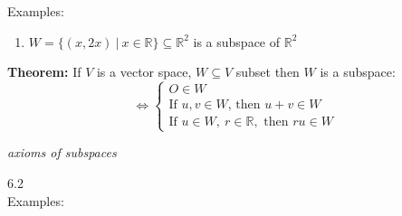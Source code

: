 \documentclass[]{article}
\begin{document}
		Examples:
		\begin{enumerate}
			\item $W=\{(x,2x)~|~x\in\mathbb{R}\}\subseteq\mathbb{R}^2$ is a subspace of $\mathbb{R}^2$
		\end{enumerate}
		{\bf Theorem:} If $V$ is a vector space, $W\subseteq V$ subset then $W$ is a subspace:
		$$
		\iff
		\begin{cases}
			O\in W\\
			\text{If }u,v\in W\text{, then }u+v\in W\\
			\text{If }u\in W,~r\in\mathbb{R},\text{ then }ru\in W
		\end{cases}
		$$
		\begin{center}
			\emph{axioms of subspaces}
		\end{center}
		\large{6.2}\\
		\normalsize
		Examples:
\end{document}
